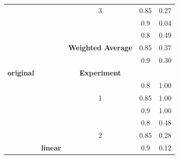 \documentclass{mpaper}
\begin{document}
\begin{table}[]
\begin{tabular}{|l|c|ccc|}
                                            &                 & \multicolumn{1}{c|}{3}                         & \multicolumn{1}{c|}{0.85}               & 0.27               \\
                                            &                 & \multicolumn{1}{c|}{}                          & \multicolumn{1}{c|}{0.9}                & 0.04               \\ \cline{3-5} 
                                            &                 & \multicolumn{1}{l|}{}                          & \multicolumn{1}{c|}{0.8}                & 0.49               \\
                                            &                 & \multicolumn{1}{c|}{\textbf{Weighted Average}} & \multicolumn{1}{c|}{0.85}               & 0.37               \\
                                            &                 & \multicolumn{1}{l|}{}                          & \multicolumn{1}{c|}{0.9}                & 0.30               \\ \cline{2-5} 
\multicolumn{1}{|c|}{\textbf{original}}     &                 & \multicolumn{1}{c|}{\textbf{Experiment}}       & \multicolumn{1}{c|}{\textbf{}}          & \textbf{}          \\ \cline{3-5} 
                                            &                 & \multicolumn{1}{c|}{}                          & \multicolumn{1}{c|}{0.8}                & 1.00               \\
                                            &                 & \multicolumn{1}{c|}{1}                         & \multicolumn{1}{c|}{0.85}               & 1.00               \\
                                            &                 & \multicolumn{1}{c|}{}                          & \multicolumn{1}{c|}{0.9}                & 1.00               \\ \cline{3-5} 
                                            &                 & \multicolumn{1}{c|}{}                          & \multicolumn{1}{c|}{0.8}                & 0.48               \\
                                            &                 & \multicolumn{1}{c|}{2}                         & \multicolumn{1}{c|}{0.85}               & 0.28               \\
                                            & \textbf{linear} & \multicolumn{1}{c|}{}                          & \multicolumn{1}{c|}{0.9}                & 0.12               \\ \cline{3-5} 

\end{tabular}
\end{table}
\end{document}
